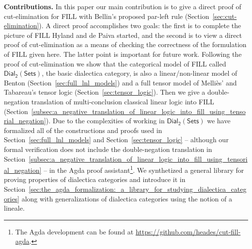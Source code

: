 \documentclass[preprint,12pt]{elsarticle}
\newcommand{\dial}[0]{\mathsf{Dial_2}(\mathsf{Sets})}
\begin{document}
\textbf{Contributions.} In this paper our main contribution is to give
a direct proof of cut-elimination for FILL with Bellin's proposed
par-left rule (Section~\ref{sec:cut-elimination}).  A direct proof
accomplishes two goals: the first is to complete the picture of FILL
Hyland and de Paiva started, and the second is to view a direct proof
of cut-elimination as a means of checking the correctness of the
formulation of FILL given here.  The latter point is important for
future work.  Following the proof of cut-elimination we show that the
categorical model of FILL called $\dial$, the basic dialectica
category, is also a linear/non-linear model of Benton
(Section~\ref{sec:full_lnl_models}) and a full tensor model of
Melli\`es' and Tabareau's tensor logic
(Section~\ref{sec:tensor_logic}). Then we give a double-negation
translation of multi-conclusion classical linear logic into FILL
(Section~\ref{subsec:a_negative_translation_of_linear_logic_into_fill_using_tensorial_negation}).
Due to the complexities of working in $\dial$ we have formalized all
of the constructions and proofs used in
Section~\ref{sec:full_lnl_models} and Section~\ref{sec:tensor_logic}
-- although our formal verification does not include the
double-negation translation in
Section~\ref{subsec:a_negative_translation_of_linear_logic_into_fill_using_tensorial_negation}
-- in the Agda proof assistant\footnote{The Agda development can be
  found at \url{https://github.com/heades/cut-fill-agda}.}.  We
synthetized
a general library for proving properties of dialectica
categories and introduce it in
Section~\ref{sec:the_agda_formalization:_a_library_for_studying_dialectica_categories}
along with generalizations of dialectica categories using the notion
of a lineale.
\end{document}
